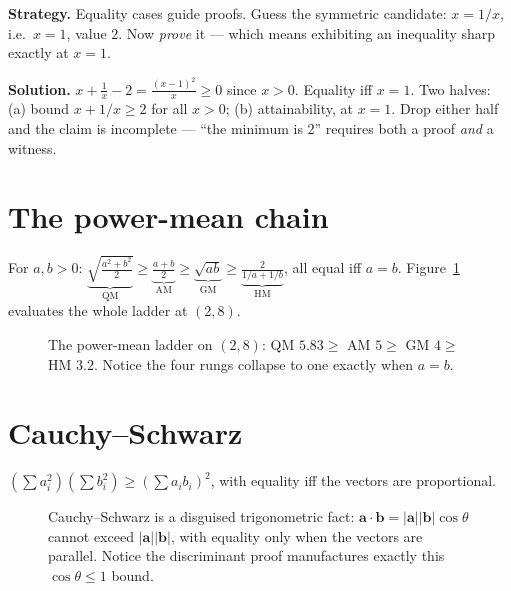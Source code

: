\begin{example}
\textbf{Strategy.} Equality cases guide proofs. Guess the symmetric
candidate: $x = 1/x$, i.e.\ $x=1$, value $2$. Now \emph{prove} it ---
which means exhibiting an inequality sharp exactly at $x=1$.

\textbf{Solution.} $x + \frac1x - 2 = \frac{(x-1)^2}{x} \ge 0$ since
$x>0$. Equality iff $x=1$. Two halves: (a) bound $x+1/x \ge 2$ for all
$x>0$; (b) attainability, at $x=1$. Drop either half and the claim is
incomplete --- ``the minimum is 2'' requires both a proof \emph{and} a
witness.
\end{example}

\section{The power-mean chain}

For $a,b>0$: $\underbrace{\sqrt{\frac{a^2+b^2}{2}}}_{\text{QM}} \ge
\underbrace{\frac{a+b}{2}}_{\text{AM}} \ge \underbrace{\sqrt{ab}}_{\text{GM}}
\ge \underbrace{\frac{2}{1/a+1/b}}_{\text{HM}}$, all equal iff $a=b$.
Figure~\ref{fig:ladder} evaluates the whole ladder at $(2,8)$.
\begin{figure}[ht]\centering

\caption{The power-mean ladder on $(2,8)$: QM $5.83 \ge$ AM $5 \ge$ GM $4
\ge$ HM $3.2$. Notice the four rungs collapse to one exactly when $a=b$.}
\label{fig:ladder}
\end{figure}

\section{Cauchy--Schwarz}

\begin{theorem}
$(\sum a_i^2)(\sum b_i^2) \ge (\sum a_ib_i)^2$, with equality iff the
vectors are proportional.
\end{theorem}

\begin{figure}[ht]\centering

\caption{Cauchy--Schwarz is a disguised trigonometric fact:
$\mathbf a\cdot\mathbf b = |\mathbf a||\mathbf b|\cos\theta$ cannot
exceed $|\mathbf a||\mathbf b|$, with equality only when the vectors are
parallel. Notice the discriminant proof manufactures exactly this
$\cos\theta \le 1$ bound.}
\label{fig:cauchyvec}
\end{figure}

